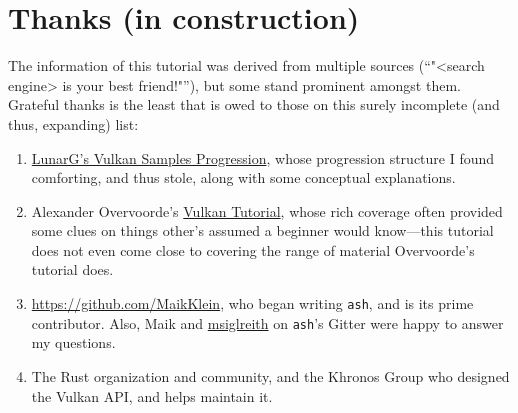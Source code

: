 \documentclass[12pt,letterpaper]{article}
\newcommand{\inquotes}[1]{``#1''}	%
\newcommand{\ash}{\texttt{ash}}
\begin{document}
\section{Thanks (in construction)}
	The information of this tutorial was derived from multiple sources (\inquotes{"<search engine> is your best friend!"}), but some stand prominent amongst them. Grateful thanks is the least that is owed to those on this surely incomplete (and thus, expanding) list:
		\begin{enumerate}
			\item \href{https://vulkan.lunarg.com/doc/sdk/1.0.65.1/windows/tutorial/html/index.html}{LunarG's Vulkan Samples Progression}, whose progression structure I found comforting, and thus stole, along with some conceptual explanations. 
			
			\item Alexander Overvoorde's \href{https://vulkan-tutorial.com/}{Vulkan Tutorial}, whose rich coverage often provided some clues on things other's assumed a beginner would know---this tutorial does not even come close to covering the range of material Overvoorde's tutorial does.
			
			\item \href{Maik Klein}{https://github.com/MaikKlein}, who began writing \ash, and is its prime contributor. Also, Maik and \href{https://github.com/msiglreith}{msiglreith} on \ash's Gitter were happy to answer my questions.
			
			\item The Rust organization and community, and the Khronos Group who designed the Vulkan API, and helps maintain it.
		\end{enumerate}
\printbibliography
\end{document}
